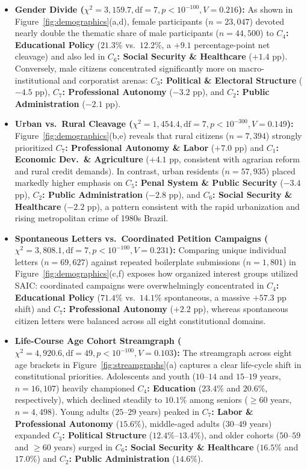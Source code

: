 \documentclass[pdflatex,sn-basic]{sn-jnl}
\begin{document}
\begin{itemize}
    \item \textbf{Gender Divide ($\chi^2 = 3,159.7, \text{df}=7, p < 10^{-100}, V = 0.216$):} As shown in Figure~\ref{fig:demographics}(a,d), female participants ($n=23,047$) devoted nearly double the thematic share of male participants ($n=44,500$) to \textbf{$C_4$: Educational Policy} ($21.3\%$ vs.\ $12.2\%$, a $+9.1$ percentage-point net cleavage) and also led in \textbf{$C_6$: Social Security \& Healthcare} ($+1.4$ pp). Conversely, male citizens concentrated significantly more on macro-institutional and corporatist arenas: \textbf{$C_3$: Political \& Electoral Structure} ($-4.5$ pp), \textbf{$C_7$: Professional Autonomy} ($-3.2$ pp), and \textbf{$C_2$: Public Administration} ($-2.1$ pp).
    \item \textbf{Urban vs.\ Rural Cleavage ($\chi^2 = 1,454.4, \text{df}=7, p < 10^{-300}, V = 0.149$):} Figure~\ref{fig:demographics}(b,e) reveals that rural citizens ($n=7,394$) strongly prioritized \textbf{$C_7$: Professional Autonomy \& Labor} ($+7.0$ pp) and \textbf{$C_1$: Economic Dev.\ \& Agriculture} ($+4.1$ pp, consistent with agrarian reform and rural credit demands). In contrast, urban residents ($n=57,935$) placed markedly higher emphasis on \textbf{$C_5$: Penal System \& Public Security} ($-3.4$ pp), \textbf{$C_2$: Public Administration} ($-2.8$ pp), and \textbf{$C_6$: Social Security \& Healthcare} ($-2.2$ pp), a pattern consistent with the rapid urbanization and rising metropolitan crime of 1980s Brazil.
    \item \textbf{Spontaneous Letters vs.\ Coordinated Petition Campaigns ($\chi^2 = 3,808.1, \text{df}=7, p < 10^{-100}, V = 0.231$):} Comparing unique individual letters ($n=69,627$) against repeated boilerplate submissions ($n=1,801$) in Figure~\ref{fig:demographics}(c,f) exposes how organized interest groups utilized SAIC: coordinated campaigns were overwhelmingly concentrated in \textbf{$C_4$: Educational Policy} ($71.4\%$ vs.\ $14.1\%$ spontaneous, a massive $+57.3$ pp shift) and \textbf{$C_7$: Professional Autonomy} ($+2.2$ pp), whereas spontaneous citizen letters were balanced across all eight constitutional domains.
    \item \textbf{Life-Course Age Cohort Streamgraph ($\chi^2 = 4,920.6, \text{df}=49, p < 10^{-100}, V = 0.103$):} The streamgraph across eight age brackets in Figure~\ref{fig:streamgraphs}(a) captures a clear life-cycle shift in constitutional priorities. Adolescents and youth ($10$--$14$ and $15$--$19$ years, $n=16,107$) heavily championed \textbf{$C_4$: Education} ($23.4\%$ and $20.6\%$, respectively), which declined steadily to $10.1\%$ among seniors ($\ge 60$ years, $n=4,498$). Young adults ($25$--$29$ years) peaked in \textbf{$C_7$: Labor \& Professional Autonomy} ($15.6\%$), middle-aged adults ($30$--$49$ years) expanded \textbf{$C_3$: Political Structure} ($12.4\%$--$13.4\%$), and older cohorts ($50$--$59$ and $\ge 60$ years) surged in \textbf{$C_6$: Social Security \& Healthcare} ($16.5\%$ and $17.0\%$) and \textbf{$C_2$: Public Administration} ($14.6\%$).

\end{itemize}
\end{document}
